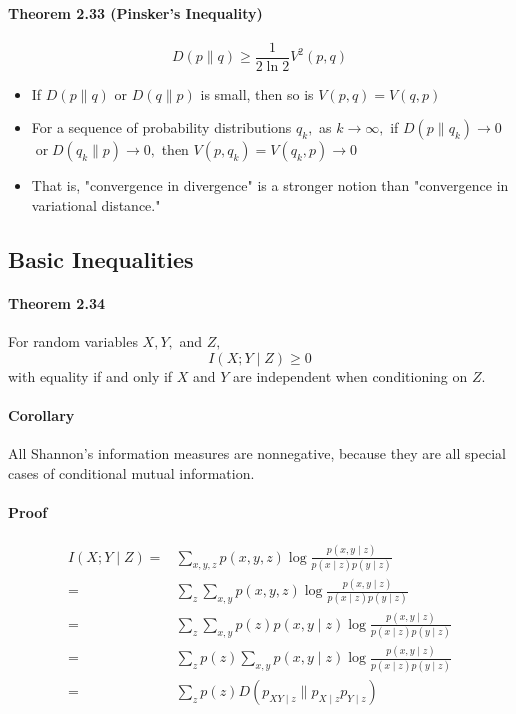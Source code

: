 \documentclass[8pt]{article}
\begin{document}
\begin{tcolorbox}
\paragraph{Theorem 2.33 (Pinsker's Inequality)}
$$
D(p \| q) \geq \frac{1}{2 \ln 2} V^{2}(p, q)
$$
\begin{itemize}
    \item If $D(p \| q)$ or $D(q \| p)$ is small, then so is $V(p, q)=V(q, p)$
    \item For a sequence of probability distributions $q_{k},$ as $k \rightarrow \infty,$ if $D\left(p \| q_{k}\right) \rightarrow 0$ $\operatorname{or} D\left(q_{k} \| p\right) \rightarrow 0,$ then $V\left(p, q_{k}\right)=V\left(q_{k}, p\right) \rightarrow 0$
    \item That is, "convergence in divergence" is a stronger notion than "convergence in variational distance."
\end{itemize}
\end{tcolorbox}

\newpage
\subsection{Basic Inequalities}
\begin{tcolorbox}
\paragraph{Theorem 2.34} For random variables $X, Y,$ and $Z,$
$$
I(X ; Y \mid Z) \geq 0
$$
with equality if and only if $X$ and $Y$ are independent when conditioning on $Z$.
\\
\paragraph{Corollary} All Shannon's information measures are nonnegative, because they are all special cases of conditional mutual information.

\end{tcolorbox}
\paragraph{Proof}
$$
\begin{aligned}
I(X ; Y \mid Z) = & \sum_{x, y, z} p(x, y, z) \log \frac{p(x, y \mid z)}{p(x \mid z) p(y \mid z)} \\
= & \sum_{z} \sum_{x, y} p(x, y, z) \log \frac{p(x, y \mid z)}{p(x \mid z) p(y \mid z)} \\
= & \sum_{z} \sum_{x, y} p(z) p(x, y \mid z) \log \frac{p(x, y \mid z)}{p(x \mid z) p(y \mid z)} \\
= & \sum_{z} p(z) \sum_{x, y} p(x, y \mid z) \log \frac{p(x, y \mid z)}{p(x \mid z) p(y \mid z)} \\
= & \sum_{z} p(z) D\left(p_{X Y \mid z} \| p_{X \mid z} p_{Y \mid z}\right)
\end{aligned}
$$
\end{document}
